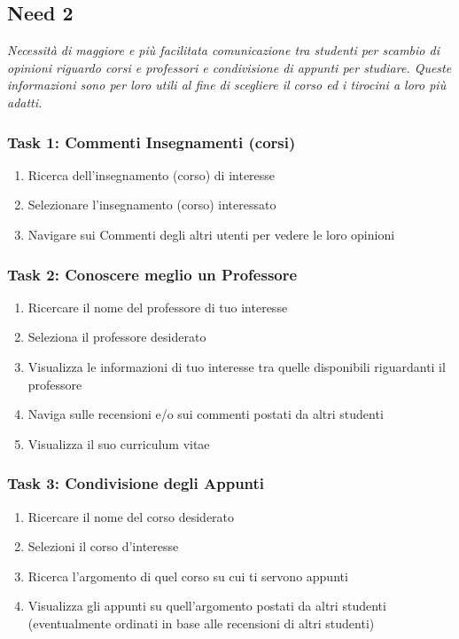 \subsection{Need 2}
\begin{center}
    \textit{Necessità di maggiore e più facilitata comunicazione tra studenti per scambio di opinioni riguardo corsi e professori e condivisione di appunti per studiare. Queste informazioni sono per loro utili al fine di scegliere il corso ed i tirocini a loro più adatti.}
\end{center}
\subsubsection{Task 1: Commenti Insegnamenti (corsi)}
\begin{enumerate}
    \item Ricerca dell'insegnamento (corso) di interesse
    \item Selezionare l'insegnamento (corso) interessato
    \item Navigare sui Commenti degli altri utenti per vedere le loro opinioni
\end{enumerate}

\subsubsection{Task 2: Conoscere meglio un Professore}
\begin{enumerate}
    \item Ricercare il nome del professore di tuo interesse
    \item Seleziona il professore desiderato
    \item Visualizza le informazioni di tuo interesse tra quelle disponibili riguardanti il professore
    \item Naviga sulle recensioni e/o sui commenti postati da altri studenti 
    \item Visualizza il suo curriculum vitae 
\end{enumerate}


\subsubsection{Task 3: Condivisione degli Appunti}
\begin{enumerate}
    \item Ricercare il nome del corso desiderato
    \item Selezioni il corso d’interesse
    \item Ricerca l’argomento di quel corso su cui ti servono appunti
    \item Visualizza gli appunti su quell’argomento postati da altri studenti (eventualmente ordinati in base alle recensioni di altri studenti)  
\end{enumerate}

